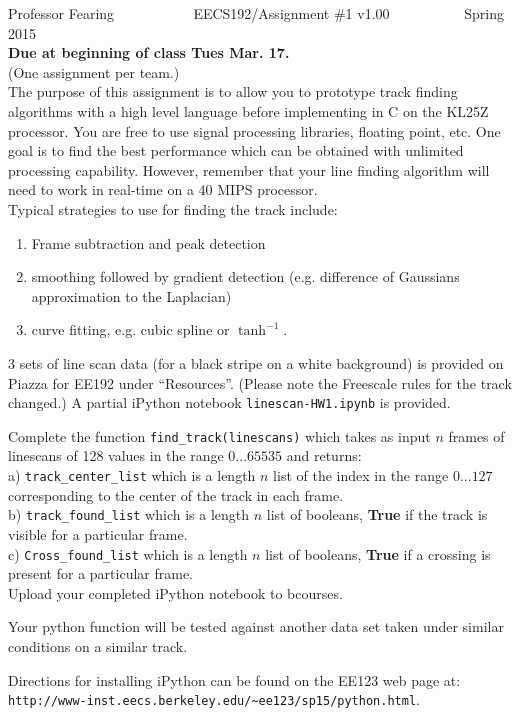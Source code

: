 \documentclass[11pt]{article}
\begin{document}
\thispagestyle{empty}
Professor Fearing ~~~~~~~~~~ EECS192/Assignment \#1 v1.00~~~~~~~~~~ Spring 2015\\
{\bf Due at beginning of class Tues Mar. 17.} \\

(One assignment per team.) \\

The purpose of this assignment is to allow you to prototype 
track finding algorithms with a high level language before
implementing in C on the KL25Z processor. You are free to use
signal processing libraries, floating point, etc. One goal is
to find the best performance which can be obtained with unlimited
processing capability. However, remember that your line finding algorithm
will need to work in real-time on a 40 MIPS processor. \\


Typical strategies to use for finding the track include:
\begin{enumerate}
\item
Frame subtraction and peak detection
\item 
smoothing followed by gradient detection (e.g. difference of Gaussians
approximation to the Laplacian)
\item
curve fitting, e.g. cubic spline or $\tanh^{-1}$.
\end{enumerate}
\vspace{0.3in}

3 sets of line scan data (for a black stripe on a white background)
is provided on Piazza for EE192 under ``Resources''.
(Please note the Freescale rules for the track changed.)
A partial iPython notebook {\tt linescan-HW1.ipynb} is provided.

Complete the function {\tt find\_track(linescans)} which takes as input
$n$ frames of linescans of 128 values in the range $0 ... 65535$ and returns:\\

a) {\tt track\_center\_list} which is a length $n$ list of the index in the range $0 ... 127$ corresponding
to the center of the track in each frame.\\

b) {\tt track\_found\_list} which is a length $n$ list of booleans, {\bf True} if the track is visible for a particular frame.\\

c) {\tt Cross\_found\_list} which is a length $n$ list of booleans, {\bf True} if a crossing is present for a particular frame.\\

Upload your completed iPython notebook to bcourses.

Your python function will be tested against another data set
taken under similar conditions on a similar track.

Directions for installing iPython can be found on the EE123 web page at:\\
{\tt http://www-inst.eecs.berkeley.edu/\~{}ee123/sp15/python.html}.
\end{document}
